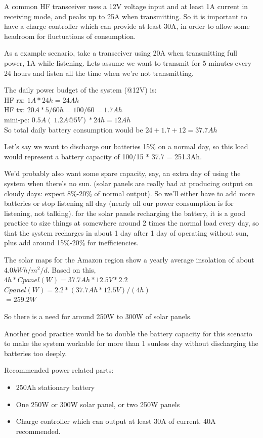 A common HF transceiver uses a 12V voltage input and at least 1A current in
receiving mode, and peaks up to 25A when transmitting. So it is important
to have a charge controller which can provide at least 30A, in order to
allow some headroom for fluctuations of consumption.

As a example scenario, take a transceiver using 20A when transmitting full
power, 1A while listening. Lets assume we want to transmit for 5 minutes
every 24 hours and listen all the time when we're not transmitting.

The daily power budget of the system (@12V) is:\\
HF rx: $1A * 24h = 24Ah$ \\
HF tx: $20A * 5/60h = 100/60 = 1.7Ah$\\
mini-pc: $0.5A (~ 1.2A@5V) * 24h = 12Ah$\\

So total daily battery consumption would be $24+1.7+12 = 37.7Ah$

Let's say we want to discharge our batteries 15\% on a normal day, so
this load would represent a battery capacity of 100/15 * 37.7 = 251.3Ah.

We'd probably also want some spare capacity, say, an extra day of using the 
system when there's no sun. (solar panels are really bad at producing output
on cloudy days: expect 8\%-20\% of normal output). So we'll either have to
add more batteries or stop listening all day (nearly all our power
consumption is for listening, not talking). for the solar panels recharging
the battery, it is a good practice to size things at somewhere around 2
times the normal load every day, so that the system recharges in about 1 day
after 1 day of operating without sun, plus add around 15\%-20\% for
inefficiencies.

The solar maps for the Amazon region show a yearly average insolation
of about $4.0 kWh/m^2/d$. Based on this,\\
$4h * Cpanel(W) = 37.7Ah*12.5V*2.2$\\
$Cpanel(W) = 2.2*(37.7Ah*12.5V)/(4h)$\\
$= 259.2W$

So there is a need for around 250W to 300W of solar panels.

Another good practice would be to double the battery capacity for this
scenario to make the system workable for more than 1 sunless day without
discharging the batteries too deeply.

Recommended power related parts:
\begin{itemize}
\item 250Ah stationary battery
\item One 250W or 300W solar panel, or two 250W panels
\item Charge controller which can output at least 30A of current. 40A
  recommended.
\end{itemize}

